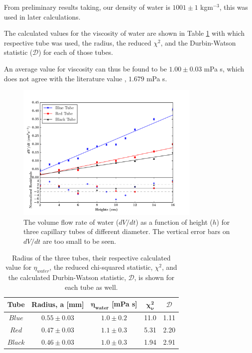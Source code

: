 \documentclass[twocolumn]{revtex4}
\begin{document}
From preliminary results taking, our density of water is ${1001 \pm 1}$ kgm$^{-3}$, this was used in later calculations.

The calculated values for the viscosity of water are shown in Table \ref{table:1} with which respective tube was used, the radius, the reduced $\chi^2$, and the Durbin-Watson statistic ($\mathcal{D}$) for each of those tubes. 

An average value for viscosity can thus be found to be $1.00 \pm 0.03$ mPa s, which does not agree with the literature value \cite{crc}, $1.679$  mPa {s}. 

\vspace{-1ex}
\begin{figure}[!h]
\begin{center}
\includegraphics[width=9cm]{fig1-2}
\caption[]{The volume flow rate of water ($dV/dt$) as a function of height ($h$) for three capillary tubes of different diameter. The vertical error bars on $dV/dt$ are too small to be seen.}
\label{fig:fig2}
\end{center}
\end{figure}

\begin{table}[h!]
\centering
\begin{tabular}{ |c|c|c|c|c| } 
 \hline
 \textbf{Tube} & \textbf{Radius, a [mm]} & \textbf{$\boldsymbol{\eta_{water}}$ [mPa {s}]} & \textbf{$\boldsymbol{\chi^2_{\nu}}$} & $\mathcal{D}$\\ [0.5ex] 
 \hline\hline
 $Blue$ &$0.55\pm0.03$ & $1.0\pm0.2$ & 11.0 & 1.11\\ 
 $Red$ & $0.47\pm0.03$ & $1.1\pm0.3$ & 5.31 & 2.20\\
 $Black$ & $0.46\pm0.03$ & $1.0\pm0.3$ & 1.94 & 2.91\\
 
 \hline
\end{tabular}
\caption{Radius of the three tubes, their respective calculated value for $\eta_{water}$, the reduced chi-squared statistic, $\chi^2$, and the calculated Durbin-Watson statistic, $\mathcal{D}$, is shown for each tube as well.}
\label{table:1}
\end{table}
\end{document}
